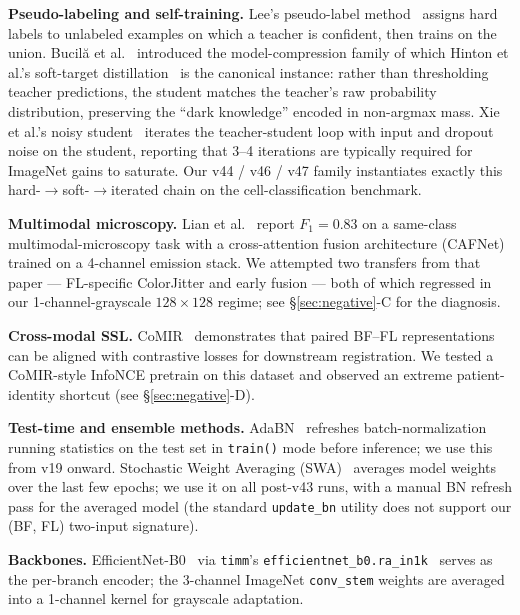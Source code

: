 \documentclass[conference]{IEEEtran}
\begin{document}
\textbf{Pseudo-labeling and self-training.} Lee's pseudo-label method~\cite{lee2013pseudo} assigns hard labels to unlabeled examples on which a teacher is confident, then trains on the union. Bucil\u{a} et al.~\cite{bucila2006compression} introduced the model-compression family of which Hinton et al.'s soft-target distillation~\cite{hinton2015distilling} is the canonical instance: rather than thresholding teacher predictions, the student matches the teacher's raw probability distribution, preserving the ``dark knowledge'' encoded in non-argmax mass. Xie et al.'s noisy student~\cite{xie2020noisystudent} iterates the teacher-student loop with input and dropout noise on the student, reporting that 3--4 iterations are typically required for ImageNet gains to saturate. Our v44 / v46 / v47 family instantiates exactly this hard-$\rightarrow$soft-$\rightarrow$iterated chain on the cell-classification benchmark.

\textbf{Multimodal microscopy.} Lian et al.~\cite{lian2024cafnet} report $F_1 = 0.83$ on a same-class multimodal-microscopy task with a cross-attention fusion architecture (CAFNet) trained on a 4-channel emission stack. We attempted two transfers from that paper --- FL-specific ColorJitter and early fusion --- both of which regressed in our 1-channel-grayscale $128\times128$ regime; see \S\ref{sec:negative}-C for the diagnosis.

\textbf{Cross-modal SSL.} CoMIR~\cite{pielawski2020comir} demonstrates that paired BF--FL representations can be aligned with contrastive losses for downstream registration. We tested a CoMIR-style InfoNCE pretrain on this dataset and observed an extreme patient-identity shortcut (see \S\ref{sec:negative}-D).

\textbf{Test-time and ensemble methods.} AdaBN~\cite{li2016adabn} refreshes batch-normalization running statistics on the test set in \texttt{train()} mode before inference; we use this from v19 onward. Stochastic Weight Averaging (SWA)~\cite{izmailov2018swa} averages model weights over the last few epochs; we use it on all post-v43 runs, with a manual BN refresh pass for the averaged model (the standard \texttt{update\_bn} utility does not support our (BF, FL) two-input signature).

\textbf{Backbones.} EfficientNet-B0~\cite{tan2019efficientnet} via \texttt{timm}'s \texttt{efficientnet\_b0.ra\_in1k}~\cite{wightman2019timm} serves as the per-branch encoder; the 3-channel ImageNet \texttt{conv\_stem} weights are averaged into a 1-channel kernel for grayscale adaptation.
\end{document}
